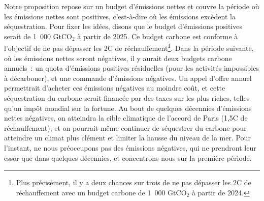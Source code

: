 \documentclass[a5paper,french]{memoir}
\begin{document}
Notre proposition repose sur un budget d'émissions nettes et couvre la période où les émissions nettes sont positives, c'est-à-dire où les émissions excèdent la séquestration. Pour fixer les idées, disons que le budget d'émissions positives serait de 1~000 GtCO$_\text{2}$ à partir de 2025. Ce budget carbone est conforme à l'objectif de ne pas dépasser les 2\textdegree{}C de réchauffement\footnote{Plus précisément, il y a deux chances sur trois de ne pas dépasser les 2\textdegree{}C de réchauffement avec un budget carbone de 1~000 GtCO$_\text{2}$ à partir de 2024.}. Dans la période suivante, où les émissions nettes seront négatives, il y aurait deux budgets carbone annuels~: un quota d'émissions positives résiduelles (pour les activités impossibles à décarboner), et une commande d'émissions négatives. Un appel d'offre annuel permettrait d'acheter ces émissions négatives au moindre coût, et cette séquestration du carbone serait financée par des taxes sur les plus riches, telles qu'un impôt mondial sur la fortune. Au bout de quelques décennies d'émissions nettes négatives, on atteindra la cible climatique de l'accord de Paris (1,5\textdegree{}C de réchauffement), et on pourrait même continuer de séquestrer du carbone pour atteindre un climat plus clément et limiter la hausse du niveau de la mer. Pour l'instant, ne nous préoccupons pas des émissions négatives, qui ne prendront leur essor que dans quelques décennies, et concentrons-nous sur la première période. 
\end{document}
